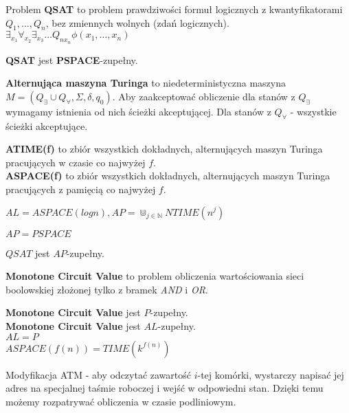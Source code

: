 \begin{definicja}
    Problem \textbf{QSAT} to problem prawdziwości formuł logicznych z kwantyfikatorami $Q_1,\ldots,Q_n$, bez zmiennych wolnych (zdań logicznych). $\exists_{x_1}\forall_{x_2}\exists_{x_3}\ldots Q_{nx_n}\phi(x_1,\ldots,x_n)$
\end{definicja}

\begin{twierdzenie}
    \textbf{QSAT} jest \textbf{PSPACE}-zupełny.
\end{twierdzenie}

\begin{definicja}
    \textbf{Alternująca maszyna Turinga} to niedeterministyczna maszyna $M=(Q_{\exists}\cup Q_{\forall},\Sigma,\delta,q_0)$. 
    Aby zaakceptować obliczenie dla stanów z $Q_{\exists}$ wymagamy istnienia od nich ścieżki akceptującej.
    Dla stanów z $Q_{\forall}$ - wszystkie ścieżki akceptujące.
\end{definicja}

\begin{definicja}
    \textbf{ATIME(f)} to zbiór wszystkich dokładnych, alternujących maszyn Turinga pracujących w czasie co najwyżej $f$. \\
    \textbf{ASPACE(f)} to zbiór wszystkich dokładnych, alternujących maszyn Turinga pracujących z pamięcią co najwyżej $f$.
\end{definicja}

\begin{definicja}
    $AL=ASPACE(logn),AP=\Cup_{j\in \mathbb{N}}NTIME(n^j)$
\end{definicja}

\begin{twierdzenie}
    $AP=PSPACE$
\end{twierdzenie}

\begin{twierdzenie}
    $QSAT$ jest $AP$-zupełny.
\end{twierdzenie}

\begin{definicja}
    \textbf{Monotone Circuit Value} to problem obliczenia wartościowania sieci boolowskiej złożonej tylko z bramek \textit{AND} i \textit{OR}.
\end{definicja}

\begin{twierdzenie}
    \textbf{Monotone Circuit Value} jest $P$-zupełny. \\
    \textbf{Monotone Circuit Value} jest $AL$-zupełny. \\
    $AL=P$ \\
    $ASPACE(f(n))=TIME(k^{f(n)})$
\end{twierdzenie}

\begin{definicja}
    Modyfikacja ATM - aby odczytać zawartość $i$-tej komórki, wystarczy napisać jej adres na specjalnej taśmie roboczej i wejść w odpowiedni stan.
    Dzięki temu możemy rozpatrywać obliczenia w czasie podliniowym.
\end{definicja}


